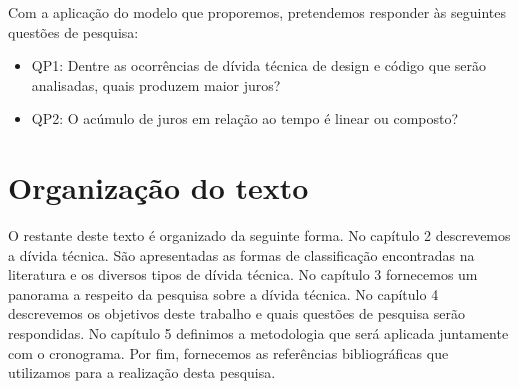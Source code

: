 Com a aplicação do modelo que proporemos, pretendemos responder às seguintes questões de pesquisa:

\begin{itemize}
\item QP1: Dentre as ocorrências de dívida técnica de design e código que serão analisadas, quais produzem maior juros?
\item QP2: O acúmulo de juros em relação ao tempo é linear ou composto?
\end{itemize}



\section{Organização do texto}

O restante deste texto é organizado da seguinte forma. No capítulo 2 descrevemos a dívida técnica. São apresentadas as formas de classificação encontradas na literatura e os diversos tipos de dívida técnica. No capítulo 3 fornecemos um panorama a respeito da pesquisa  sobre a dívida técnica. No capítulo 4 descrevemos os objetivos deste trabalho e quais questões de pesquisa serão respondidas. No capítulo 5 definimos a metodologia que será aplicada juntamente com o cronograma. Por fim, fornecemos as referências bibliográficas que utilizamos para a realização desta pesquisa.



